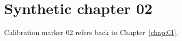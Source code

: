 \chapter{Synthetic chapter 02}\label{chap:02}
Calibration marker 02 refers back to Chapter~\ref{chap:01}.
